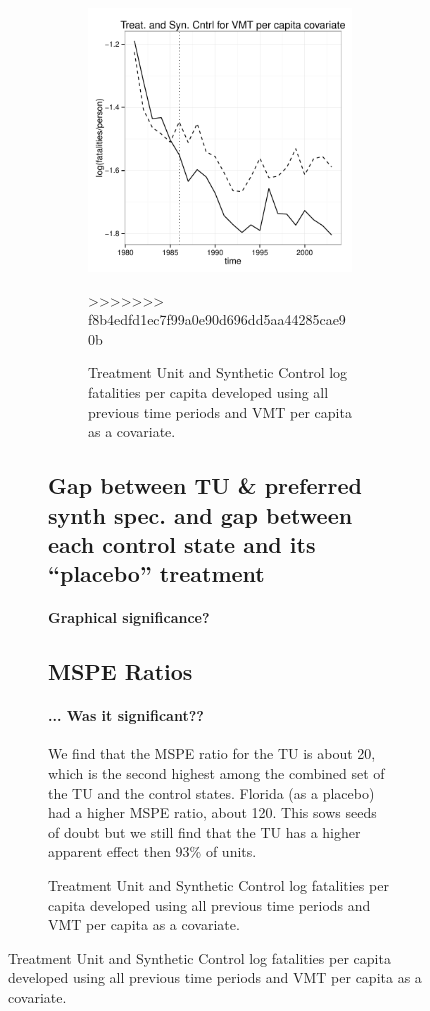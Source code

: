 \documentclass[letterpaper, 12pt]{article}
\begin{document}
\begin{figure}
\begin{centering}
\begin{figure}
\begin{centering}
\begin{figure}[htbp]
\begin{center}
\includegraphics{img-split-vmt.pdf}
\caption{Treatment Unit and Synthetic Control log fatalities per capita developed using all previous time periods and VMT per capita as a covariate.}
\label{fig:c16}
\end{center}
>>>>>>> f8b4edfd1ec7f99a0e90d696dd5aa44285cae90b
\end{figure}


\subsection{Gap between TU \& preferred synth spec. and gap between each control state and its ``placebo'' treatment}

\paragraph{Graphical significance?}


\subsection{MSPE Ratios}

\paragraph{... Was it significant??}  We find that the MSPE ratio for the TU is about 20, which is the second highest among the combined set of the TU and the control states.  Florida (as a placebo) had a higher MSPE ratio, about 120.  This sows seeds of doubt but we still find that the TU has a higher apparent effect then 93\% of units.  



\end{centering}
\end{figure}
\end{centering}
\end{figure}
\end{document}
